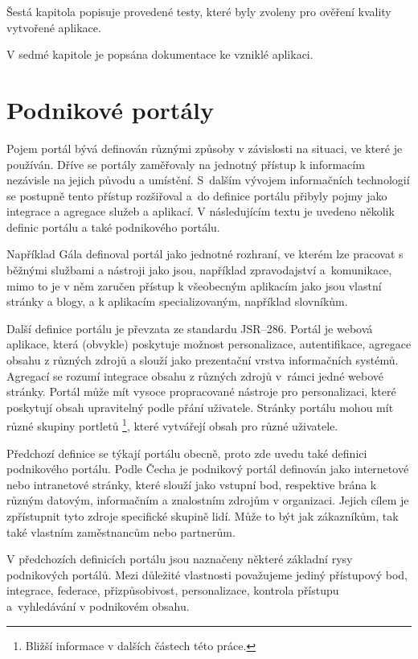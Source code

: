 \documentclass{fithesis}
\begin{document}
Šestá kapitola popisuje provedené testy, které byly zvoleny pro ověření kvality vytvořené aplikace. 

V sedmé kapitole je popsána dokumentace ke vzniklé aplikaci.







\chapter{Podnikové portály}
Pojem portál bývá definován různými způsoby v závislosti na situaci, ve které je používán. Dříve se portály zaměřovaly na jednotný přístup k informacím nezávisle na jejich původu a umístění. S~dalším vývojem informačních technologií se postupně tento přístup rozšiřoval a~do definice portálu přibyly pojmy jako integrace a agregace služeb a aplikací. V následujícím textu je uvedeno několik definic portálu a také podnikového portálu.

Například Gála definoval portál jako jednotné rozhraní, ve kterém lze pracovat s běžnými službami a nástroji jako jsou, například zpravodajství a~komunikace, mimo to je v něm zaručen přístup k všeobecným aplikacím jako jsou vlastní stránky a blogy, a k aplikacím specializovaným, například slovníkům. \cite{gala}

Další definice portálu je převzata ze standardu JSR--286. Portál je webová aplikace, která (obvykle) poskytuje možnost personalizace, autentifikace, agregace obsahu z různých zdrojů a slouží jako prezentační vrstva informačních systémů. Agregací se rozumí integrace obsahu z různých zdrojů v~rámci jedné webové stránky. Portál může mít vysoce propracované nástroje pro personalizaci, které poskytují obsah upravitelný podle přání uživatele. Stránky portálu mohou mít různé skupiny portletů \footnote[1]{Bližší informace v dalších částech této práce.}, které vytvářejí obsah pro různé uživatele.  \cite{jsr-286}

Předchozí definice se týkají portálu obecně, proto zde uvedu také definici podnikového portálu. Podle Čecha je podnikový portál definován jako internetové nebo intranetové stránky, které slouží jako vstupní bod, respektive brána k různým datovým, informačním a znalostním zdrojům v organizaci. Jejich cílem je zpřístupnit tyto zdroje specifické skupině lidí. Může to být jak zákazníkům, tak také vlastním zaměstnancům nebo partnerům. \cite{cech}

V předchozích definicích portálu jsou naznačeny některé základní rysy podnikových portálů. Mezi důležité vlastnosti považujeme jediný přístupový bod, integrace, federace, přizpůsobivost, personalizace, kontrola přístupu a~vyhledávání v podnikovém obsahu.\cite{enterprise-portal}
\end{document}
